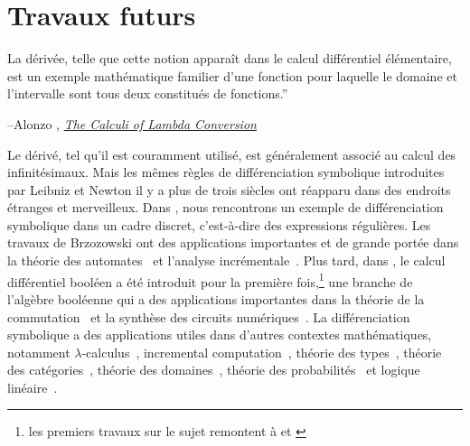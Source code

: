 \section{Travaux futurs}\label{sec:future-work}


\vspace{2pt}\setlength{\epigraphwidth}{0.65\textwidth}
\epigraph{La dérivée, telle que cette notion apparaît dans le calcul différentiel élémentaire, est un exemple mathématique familier d'une fonction pour laquelle le domaine et l'intervalle sont tous deux constitués de fonctions.''}{\begin{flushright}--Alonzo \citet{church1941calculi}, \href{https://archive.org/details/AnnalsOfMathematicalStudies6ChurchAlonzoTheCalculiOfLambdaConversionPrincetonUniversityPress1941}{\textit{The Calculi of Lambda Conversion}}\end{flushright}}

Le dérivé, tel qu'il est couramment utilisé, est généralement associé au calcul des infinitésimaux. Mais les mêmes règles de différenciation symbolique introduites par Leibniz et Newton il y a plus de trois siècles ont réapparu dans des endroits étranges et merveilleux. Dans \citet{brzozowski1964derivatives}, nous rencontrons un exemple de différenciation symbolique dans un cadre discret, c'est-à-dire des expressions régulières. Les travaux de Brzozowski ont des applications importantes et de grande portée dans la théorie des automates~\citep{berry1986regex, antimirov1996partial, champarnaud1999regular} et l'analyse incrémentale~\citep{might2011parsing, moss2014derivatives}. Plus tard, dans \citet{thayse1981boolean}, le calcul différentiel booléen a été introduit pour la première fois,\hspace{-. 08em}\footnote{\aussi les premiers travaux sur le sujet remontent à \citet{talantsev1959analysis} et \citet{sellers1968analysing}} une branche de l'algèbre booléenne qui a des applications importantes dans la théorie de la commutation~\citep{thayse1973boolean} et la synthèse des circuits numériques~\citep{steinbach2017boolean}. La différenciation symbolique a des applications utiles dans d'autres contextes mathématiques, notamment $\lambda$-calculus~\citep{ehrhard2003differential, cai2014theory, kelly2016evolving, brunel2020backpropagation}, incremental computation~\citep{alvarez2019fixing, alvarez2019change}, théorie des types~\citep{mcbride2001dérivée, mcbride2008clowns, chen2012type}, théorie des catégories~\citep{blute2006differentielle, blute2009cartesian}, théorie des domaines~\citep{edalat2002domaine}, théorie des probabilités~\citep{kac1951probabilité} et logique linéaire~\citep{ehrhard2018introduction, clift2018dérivées}.

